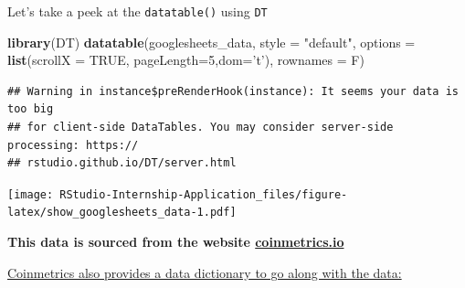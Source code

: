 \documentclass[
]{book}
\newenvironment{Shaded}{\begin{snugshade}}{\end{snugshade}}
\newcommand{\DataTypeTok}[1]{\textcolor[rgb]{0.13,0.29,0.53}{#1}}
\newcommand{\DecValTok}[1]{\textcolor[rgb]{0.00,0.00,0.81}{#1}}
\newcommand{\KeywordTok}[1]{\textcolor[rgb]{0.13,0.29,0.53}{\textbf{#1}}}
\newcommand{\NormalTok}[1]{#1}
\newcommand{\OtherTok}[1]{\textcolor[rgb]{0.56,0.35,0.01}{#1}}
\newcommand{\StringTok}[1]{\textcolor[rgb]{0.31,0.60,0.02}{#1}}
\begin{document}
Let's take a peek at the \texttt{datatable()} using \texttt{DT} \citep{R-DT}

\begin{Shaded}
\begin{Highlighting}[]
\KeywordTok{library}\NormalTok{(DT)}
\KeywordTok{datatable}\NormalTok{(googlesheets_data,  }\DataTypeTok{style =} \StringTok{"default"}\NormalTok{, }
          \DataTypeTok{options =} \KeywordTok{list}\NormalTok{(}\DataTypeTok{scrollX =} \OtherTok{TRUE}\NormalTok{, }\DataTypeTok{pageLength=}\DecValTok{5}\NormalTok{,}\DataTypeTok{dom=}\StringTok{'t'}\NormalTok{), }\DataTypeTok{rownames =}\NormalTok{ F)}
\end{Highlighting}
\end{Shaded}

\begin{verbatim}
## Warning in instance$preRenderHook(instance): It seems your data is too big
## for client-side DataTables. You may consider server-side processing: https://
## rstudio.github.io/DT/server.html
\end{verbatim}

\texttt{[image: RStudio-Internship-Application\_files/figure-latex/show\_googlesheets\_data-1.pdf]}

\textbf{This data is sourced from the website \href{https://coinmetrics.io/community-network-data/\#comm-files}{coinmetrics.io}}

\href{https://coinmetrics.io/community-data-dictionary/}{Coinmetrics also provides a data dictionary to go along with the data:}
\end{document}
